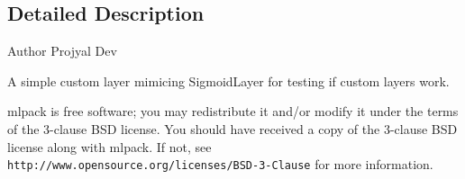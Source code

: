 \subsection{Detailed Description}
\begin{DoxyAuthor}{Author}
Projyal Dev
\end{DoxyAuthor}
A simple custom layer mimicing Sigmoid\+Layer for testing if custom layers work.

mlpack is free software; you may redistribute it and/or modify it under the terms of the 3-\/clause B\+SD license. You should have received a copy of the 3-\/clause B\+SD license along with mlpack. If not, see {\tt http\+://www.\+opensource.\+org/licenses/\+B\+S\+D-\/3-\/\+Clause} for more information. 